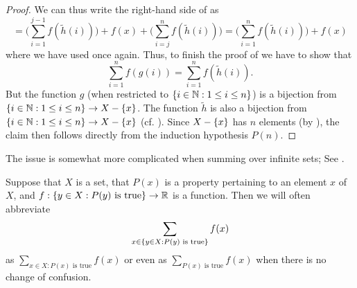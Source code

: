 \begin{proof}
  We can thus write the right-hand side of  as
  \[
    = \Bigg(\sum_{i = 1}^{j - 1} f(\tilde{h}(i))\Bigg) + f(x) + \Bigg(\sum_{i = j}^n f(\tilde{h}(i))\Bigg) = \Bigg(\sum_{i = 1}^n f(\tilde{h}(i))\Bigg) + f(x)
  \]
  where we have used  once again.
  Thus, to finish the proof of  we have to show that
  \[
    \sum_{i = 1}^n f(g(i)) = \sum_{i = 1}^n f(\tilde{h}(i)). \tag{i:7.2}\label{i:eq 7.2}
  \]
  But the function \(g\) (when restricted to \(\left\lbrace i \in \mathbb{N} : 1 \leq i \leq n\right\rbrace\)) is a bijection from \(\left\lbrace i \in \mathbb{N} : 1 \leq i \leq n\right\rbrace \to X - \left\lbrace x\right\rbrace\).
  The function \(\tilde{h}\) is also a bijection from \(\left\lbrace i \in \mathbb{N} : 1 \leq i \leq n\right\rbrace \to X - \left\lbrace x\right\rbrace\) (cf. ).
  Since \(X - \left\lbrace x\right\rbrace\) has \(n\) elements (by ), the claim  then follows directly from the induction hypothesis \(P(n)\).
\end{proof}

\begin{rmk}\label{i:7.1.9}
  The issue is somewhat more complicated when summing over infinite sets;
  See .
\end{rmk}

\begin{rmk}\label{i:7.1.10}
  Suppose that \(X\) is a set, that \(P(x)\) is a property pertaining to an element \(x\) of \(X\), and \(f : \left\lbrace y \in X : P(y) \text{ is true}\right\rbrace \to \mathbb{R}\) is a function.
  Then we will often abbreviate
  \[
    \sum_{x \in \left\lbrace y \in X : P(y) \text{ is true}\right\rbrace} f(x)
  \]
  as \(\sum_{x \in X : P(x) \text{ is true}} f(x)\) or even as \(\sum_{P(x) \text{ is true}} f(x)\) when there is no change of confusion.
\end{rmk}

